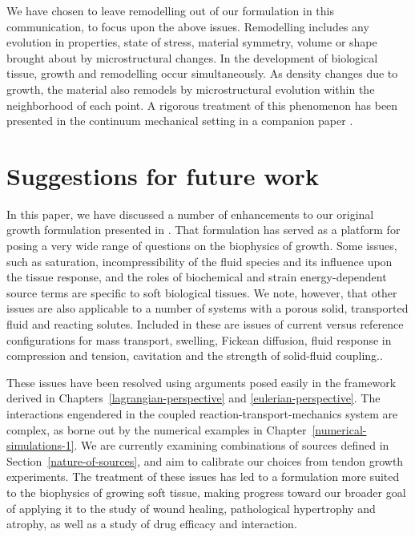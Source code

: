 We have chosen to leave remodelling out of our formulation in this
communication, to focus upon the above issues. Remodelling
includes any evolution in properties, state of stress, material
symmetry, volume or shape brought about by microstructural
changes. In the development of biological tissue, growth and
remodelling occur simultaneously. As density changes due to
growth, the material also remodels by microstructural evolution
within the neighborhood of each point. A rigorous treatment of
this phenomenon has been presented in the continuum mechanical
setting in a companion paper \citep{remodelpaper}.

\section{Suggestions for future work}
\label{future-work}

In this paper, we have discussed a number of enhancements to our
original growth formulation presented in \citet{growthpaper}. That
formulation has served as a platform for posing a very wide range of
questions on the biophysics of growth. Some issues, such as
saturation, incompressibility of the fluid species and its influence
upon the tissue response, and the roles of biochemical and strain
energy-dependent source terms are specific to soft biological
tissues. We note, however, that other issues are also applicable to a
number of systems with a porous solid, transported fluid and reacting
solutes. Included in these are issues of current versus reference
configurations for mass transport, swelling, Fickean diffusion, fluid
response in compression and tension, cavitation and the strength of
solid-fluid coupling..

These issues have been resolved using arguments posed easily in the
framework derived in Chapters~\ref{lagrangian-perspective} and
\ref{eulerian-perspective}. The 
interactions engendered 
in the coupled reaction-trans\-port-mechanics system are complex, as
borne out by the numerical examples in
Chapter~\ref{numerical-simulations-1}. We are currently examining
combinations of sources defined in Section~\ref{nature-of-sources}, and aim to
calibrate our choices from tendon growth experiments. The treatment of
these issues has led to a formulation more suited to the biophysics of
growing soft tissue, making progress toward our broader goal of
applying it to the study of wound healing, pathological hypertrophy
and atrophy, as well as a study of drug efficacy and interaction.

